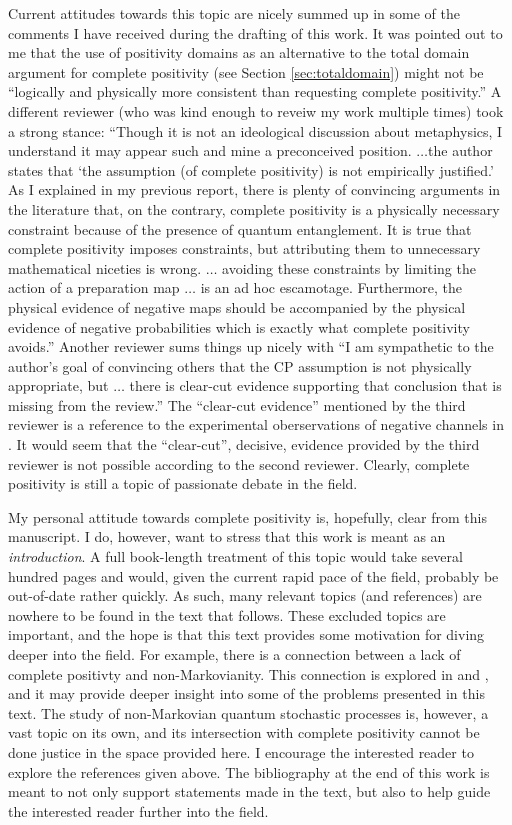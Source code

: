 Current attitudes towards this topic are nicely summed up in some of the comments I have received during the drafting of this work.  It was pointed out to me that the use of positivity domains as an alternative to the total domain argument for complete positivity (see Section \ref{sec:totaldomain}) might not be ``logically and physically more consistent than requesting complete positivity.''  A different reviewer (who was kind enough to reveiw my work multiple times) took a strong stance: ``Though it is not an ideological discussion about metaphysics, I understand it may appear such and mine a preconceived position. $\ldots$the author states that `the assumption (of complete positivity) is not empirically justified.' As I explained in my previous report, there is plenty of convincing arguments in the literature that, on the contrary, complete positivity is a physically necessary constraint because of the presence of quantum entanglement. It is true that complete positivity imposes constraints, but attributing them to unnecessary mathematical niceties is wrong.  $\ldots$ avoiding these constraints by limiting the action of a preparation map $\ldots$ is an ad hoc escamotage.  Furthermore, the physical evidence of negative maps should be accompanied by the physical evidence of negative probabilities which is exactly what complete positivity avoids.''  Another reviewer sums things up nicely with ``I am sympathetic to the author's goal of convincing others that the CP assumption is not physically appropriate, but $\ldots$ there is clear-cut evidence supporting that conclusion that is missing from the review.''  The ``clear-cut evidence'' mentioned by the third reviewer is a reference to the experimental oberservations of negative channels in \cite{Boulant2004}.  It would seem that the ``clear-cut'', decisive, evidence provided by the third reviewer is not possible according to the second reviewer.  Clearly, complete positivity is still a topic of passionate debate in the field.

My personal attitude towards complete positivity is, hopefully, clear from this manuscript.  I do, however, want to stress that this work is meant as an {\em introduction}.  A full book-length treatment of this topic would take several hundred pages and would, given the current rapid pace of the field, probably be out-of-date rather quickly.  As such, many relevant topics (and references) are nowhere to be found in the text that follows.  These excluded topics are important, and the hope is that this text provides some motivation for diving deeper into the field.  For example, there is a connection between a lack of complete positivty and non-Markovianity.  This connection is explored in \cite{Rodríguez2012} and \cite{Mazzola2012}, and it may provide deeper insight into some of the problems presented in this text.  The study of non-Markovian quantum stochastic processes is, however, a vast topic on its own, and its intersection with complete positivity cannot be done justice in the space provided here.  I encourage the interested reader to explore the references given above.  The bibliography at the end of this work is meant to not only support statements made in the text, but also to help guide the interested reader further into the field.

